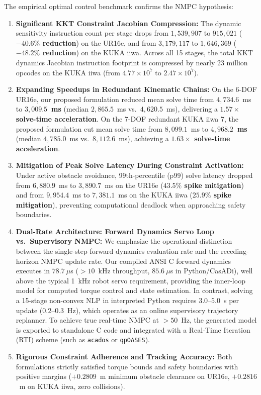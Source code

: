 \documentclass[fleqn,10pt]{article}
\begin{document}
The empirical optimal control benchmark confirms the NMPC hypothesis:
\begin{enumerate}
	\item \textbf{Significant KKT Constraint Jacobian Compression:} The dynamic sensitivity instruction count per stage drops from $1,539,907$ to $915,021$ (\textbf{$-40.6\%$ reduction}) on the UR16e, and from $3,179,117$ to $1,646,369$ (\textbf{$-48.2\%$ reduction}) on the KUKA iiwa. Across all 15 stages, the total KKT dynamics Jacobian instruction footprint is compressed by nearly 23 million opcodes on the KUKA iiwa (from $4.77 \times 10^7$ to $2.47 \times 10^7$).
	\item \textbf{Expanding Speedups in Redundant Kinematic Chains:} On the 6-DOF UR16e, our proposed formulation reduced mean solve time from $4,734.6$~ms to \textbf{$3,009.5$~ms} (median $2,865.5$~ms vs.\ $4,620.5$~ms), delivering a \textbf{$1.57\times$ solve-time acceleration}. On the 7-DOF redundant KUKA iiwa 7, the proposed formulation cut mean solve time from $8,099.1$~ms to \textbf{$4,968.2$~ms} (median $4,785.0$~ms vs.\ $8,112.6$~ms), achieving a \textbf{$1.63\times$ solve-time acceleration}.
	\item \textbf{Mitigation of Peak Solve Latency During Constraint Activation:} Under active obstacle avoidance, 99th-percentile (p99) solve latency dropped from $6,880.9$~ms to $3,890.7$~ms on the UR16e (\textbf{$43.5\%$ spike mitigation}) and from $9,954.4$~ms to $7,381.1$~ms on the KUKA iiwa (\textbf{$25.9\%$ spike mitigation}), preventing computational deadlock when approaching safety boundaries.
	\item \textbf{Dual-Rate Architecture: Forward Dynamics Servo Loop vs.\ Supervisory NMPC:} We emphasize the operational distinction between the single-step forward dynamics evaluation rate and the receding-horizon NMPC update rate. Our compiled ANSI C forward dynamics executes in $78.7~\mu$s ($>10$~kHz throughput, $85.6~\mu$s in Python/CasADi), well above the typical 1~kHz robot servo requirement, providing the inner-loop model for computed torque control and state estimation. In contrast, solving a 15-stage non-convex NLP in interpreted Python requires $3.0$--$5.0$~s per update ($0.2$--$0.3$~Hz), which operates as an online supervisory trajectory replanner. To achieve true real-time NMPC at $>50$~Hz, the generated model is exported to standalone C code and integrated with a Real-Time Iteration (RTI) scheme (such as \texttt{acados} or \texttt{qpOASES}).
	\item \textbf{Rigorous Constraint Adherence and Tracking Accuracy:} Both formulations strictly satisfied torque bounds and safety boundaries with positive margins ($+0.2809$~m minimum obstacle clearance on UR16e, $+0.2816$~m on KUKA iiwa, zero collisions).
\end{enumerate}
\end{document}
